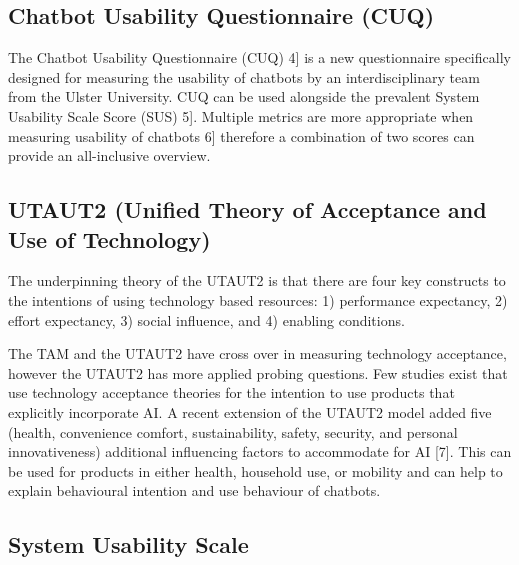 \documentclass[a4paper, nobind]{templates/ociamthesis}
\begin{document}
\hypertarget{chatbot-usability-questionnaire-cuq}{%
\subsection{Chatbot Usability Questionnaire (CUQ)}\label{chatbot-usability-questionnaire-cuq}}

The Chatbot Usability Questionnaire (CUQ) \hspace{0pt}{[}4{]}\hspace{0pt} is a new questionnaire specifically designed for measuring the usability of chatbots by an interdisciplinary team from the Ulster University.
CUQ can be used alongside the prevalent System Usability Scale Score (SUS) \hspace{0pt}{[}5{]}\hspace{0pt}.
Multiple metrics are more appropriate when measuring usability of chatbots \hspace{0pt}{[}6{]}\hspace{0pt} therefore a combination of two scores can provide an all-inclusive overview.

\hypertarget{utaut2-unified-theory-of-acceptance-and-use-of-technology}{%
\subsection{UTAUT2 (Unified Theory of Acceptance and Use of Technology)}\label{utaut2-unified-theory-of-acceptance-and-use-of-technology}}

The underpinning theory of the UTAUT2 is that there are four key constructs to the intentions of using technology based resources: 1) performance expectancy, 2) effort expectancy, 3) social influence, and 4) enabling conditions.

The TAM and the UTAUT2 have cross over in measuring technology acceptance, however the UTAUT2 has more applied probing questions.
Few studies exist that use technology acceptance theories for the intention to use products that explicitly incorporate AI.
A recent extension of the UTAUT2 model added five (health, convenience comfort, sustainability, safety, security, and personal innovativeness) additional influencing factors to accommodate for AI {[}7{]}.
This can be used for products in either health, household use, or mobility and can help to explain behavioural intention and use behaviour of chatbots.

\hypertarget{system-usability-scale}{%
\subsection{System Usability Scale}\label{system-usability-scale}}
\end{document}
